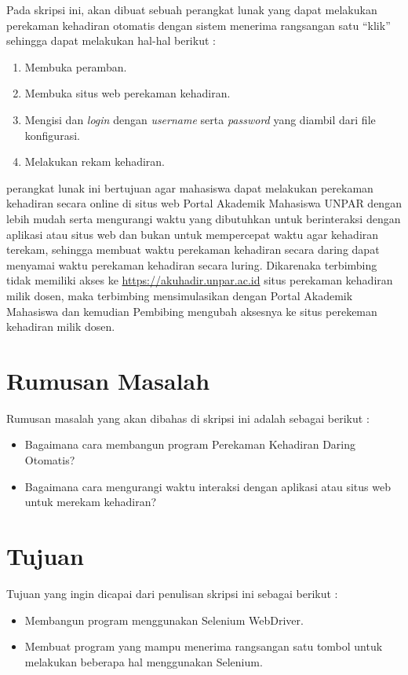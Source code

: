 \documentclass[a4paper,twoside]{article}
\begin{document}
Pada skripsi ini, akan dibuat sebuah perangkat lunak yang dapat melakukan perekaman kehadiran otomatis dengan sistem menerima rangsangan satu ``klik'' sehingga dapat melakukan hal-hal berikut :
\begin{enumerate}
	\item Membuka peramban.
	\item Membuka situs web perekaman kehadiran.
	\item Mengisi dan \textit{login} dengan \textit{username} serta \textit{password} yang diambil dari file konfigurasi.
	\item Melakukan rekam kehadiran.
\end{enumerate} 
perangkat lunak ini bertujuan agar mahasiswa dapat melakukan perekaman kehadiran secara online di situs web Portal Akademik Mahasiswa UNPAR dengan lebih mudah serta mengurangi waktu yang dibutuhkan untuk berinteraksi dengan aplikasi atau situs web dan bukan untuk mempercepat waktu agar kehadiran terekam, sehingga membuat waktu perekaman kehadiran secara daring dapat menyamai waktu perekaman kehadiran secara luring. Dikarenaka terbimbing tidak memiliki akses ke \url{https://akuhadir.unpar.ac.id} situs perekaman kehadiran milik dosen, maka terbimbing mensimulasikan dengan Portal Akademik Mahasiswa dan kemudian Pembibing mengubah aksesnya ke situs perekeman kehadiran milik dosen.

\section{Rumusan Masalah}
Rumusan masalah yang akan dibahas di skripsi ini adalah sebagai berikut :
\begin{itemize}
	\item Bagaimana cara membangun program Perekaman Kehadiran Daring Otomatis?
	\item Bagaimana cara mengurangi waktu interaksi dengan aplikasi atau situs web untuk merekam kehadiran?
\end{itemize}

\section{Tujuan}
Tujuan yang ingin dicapai dari penulisan skripsi ini sebagai berikut :
\begin{itemize}
	\item Membangun program menggunakan Selenium WebDriver.
	\item Membuat program yang mampu menerima rangsangan satu tombol untuk melakukan beberapa hal menggunakan Selenium.
\end{itemize}
\end{document}
